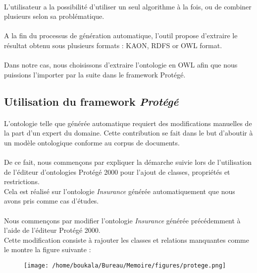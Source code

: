 \documentclass[12pt, a4paper, oneside]{book}
\begin{document}
\paragraph{}
L'utilisateur a la possibilité d'utiliser un seul algorithme à la fois, ou de combiner plusieurs selon sa problématique.
\paragraph{}
A la fin du processus de génération automatique, l'outil propose d'extraire le résultat obtenu sous plusieurs formats : KAON, RDFS or OWL format.
\paragraph{}
Dans notre cas, nous choisissons d'extraire l'ontologie en OWL afin que nous puissions l'importer par la suite dans le framework Protégé.


\subsection{Utilisation du framework \emph{Protégé}}
\paragraph{}
L'ontologie telle que générée automatique requiert des modifications manuelles de la part d'un expert du domaine. Cette contribution se fait dans le but d'aboutir à un modèle ontologique conforme au corpus de documents. 
\paragraph{}
De ce fait, nous commençons par expliquer la démarche suivie lors de l'utilisation de l'éditeur d'ontologies Protégé 2000 pour l'ajout de classes, propriétés et restrictions. \\
Cela est réalisé sur l'ontologie \emph{Insurance} générée automatiquement que nous avons pris comme cas
d'études.
\paragraph{}
Nous commençons par modifier l'ontologie \emph{Insurance} générée précédemment à l'aide de l'éditeur Protégé 2000.\\ Cette modification consiste à rajouter les classes et relations manquantes comme le montre la figure suivante :


\begin{figure}[h!]
\begin{center}
\texttt{[image: /home/boukala/Bureau/Memoire/figures/protege.png]}
\end{center}
\end{figure}
\end{document}
